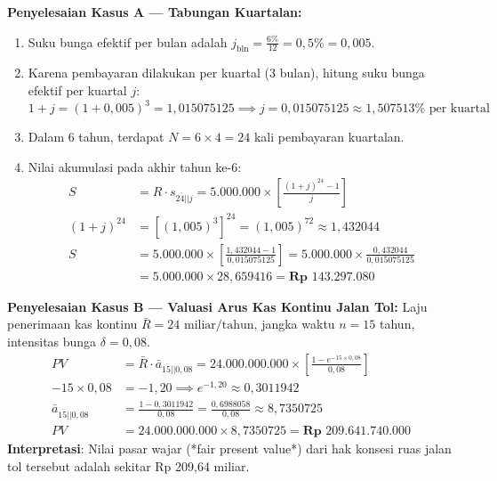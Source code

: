 \documentclass[11pt,a4paper]{article}
\newcommand{\angl}[1]{\overline{#1|}}
\begin{document}
\begin{solusibox}
\textbf{Penyelesaian Kasus A --- Tabungan Kuartalan:}
\begin{enumerate}[leftmargin=4mm, topsep=1pt, itemsep=1pt]
    \item Suku bunga efektif per bulan adalah $j_{\text{bln}} = \frac{6\%}{12} = 0{,}5\% = 0{,}005$.
    \item Karena pembayaran dilakukan per kuartal (3 bulan), hitung suku bunga efektif per kuartal $j$:
    $$1 + j = (1 + 0{,}005)^3 = 1{,}015075125 \implies j = 0{,}015075125 \approx 1{,}507513\% \text{ per kuartal}$$
    \item Dalam 6 tahun, terdapat $N = 6 \times 4 = 24$ kali pembayaran kuartalan.
    \item Nilai akumulasi pada akhir tahun ke-6:
    \begin{align*}
        S &= R \cdot s_{\angl{24}|j} = 5.000.000 \times \left[ \frac{(1 + j)^{24} - 1}{j} \right] \\
        (1 + j)^{24} &= \left[(1{,}005)^3\right]^{24} = (1{,}005)^{72} \approx 1{,}432044 \\
        S &= 5.000.000 \times \left[ \frac{1{,}432044 - 1}{0{,}015075125} \right] = 5.000.000 \times \frac{0{,}432044}{0{,}015075125} \\
        &= 5.000.000 \times 28{,}659416 = \mathbf{\text{Rp } 143.297.080}
    \end{align*}
\end{enumerate}

\textbf{Penyelesaian Kasus B --- Valuasi Arus Kas Kontinu Jalan Tol:}
Laju penerimaan kas kontinu $\bar{R} = 24\text{ miliar/tahun}$, jangka waktu $n = 15$ tahun, intensitas bunga $\delta = 0{,}08$.
\begin{align*}
    PV &= \bar{R} \cdot \bar{a}_{\angl{15}|0{,}08} = 24.000.000.000 \times \left[ \frac{1 - e^{-15 \times 0{,}08}}{0{,}08} \right] \\
    -15 \times 0{,}08 &= -1{,}20 \implies e^{-1{,}20} \approx 0{,}3011942 \\
    \bar{a}_{\angl{15}|0{,}08} &= \frac{1 - 0{,}3011942}{0{,}08} = \frac{0{,}6988058}{0{,}08} \approx 8{,}7350725 \\
    PV &= 24.000.000.000 \times 8{,}7350725 = \mathbf{\text{Rp } 209.641.740.000}
\end{align*}
\textbf{Interpretasi}: Nilai pasar wajar (*fair present value*) dari hak konsesi ruas jalan tol tersebut adalah sekitar Rp 209,64 miliar.
\end{solusibox}
\end{document}
